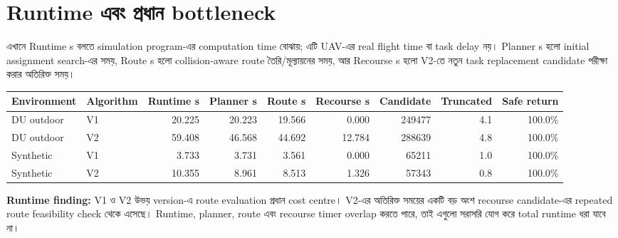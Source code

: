 \documentclass[10pt,a4paper]{article}
\begin{document}
\section{Runtime এবং প্রধান bottleneck}
এখানে Runtime s বলতে simulation program-এর computation time বোঝায়; এটি UAV-এর real flight time বা task delay নয়। Planner s হলো initial assignment search-এর সময়, Route s হলো collision-aware route তৈরি/মূল্যায়নের সময়, আর Recourse s হলো V2-তে নতুন task replacement candidate পরীক্ষা করার অতিরিক্ত সময়।
\begin{table}[H]\centering\scriptsize\begin{tabular}{@{}llrrrrrrr@{}}\toprule Environment & Algorithm & Runtime s & Planner s & Route s & Recourse s & Candidate & Truncated & Safe return\\\midrule
DU outdoor & V1 & 20.225 & 20.223 & 19.566 & 0.000 & 249477 & 4.1 & 100.0\% \\

DU outdoor & V2 & 59.408 & 46.568 & 44.692 & 12.784 & 288639 & 4.8 & 100.0\% \\

Synthetic & V1 & 3.733 & 3.731 & 3.561 & 0.000 & 65211 & 1.0 & 100.0\% \\

Synthetic & V2 & 10.355 & 8.961 & 8.513 & 1.326 & 57343 & 0.8 & 100.0\% \\

\bottomrule\end{tabular}\end{table}
\textbf{Runtime finding:} V1 ও V2 উভয় version-এ route evaluation প্রধান cost centre। V2-এর অতিরিক্ত সময়ের একটি বড় অংশ recourse candidate-এর repeated route feasibility check থেকে এসেছে। Runtime, planner, route এবং recourse timer overlap করতে পারে, তাই এগুলো সরাসরি যোগ করে total runtime ধরা যাবে না।
\end{document}

